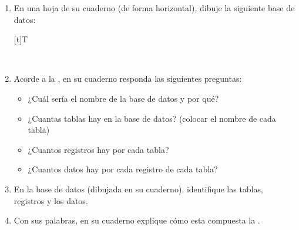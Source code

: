 \documentclass[letterpaper,10pt,spanish]{sphinxmanual}
\let\sphinxpxdimen\pdfpxdimen\else\newdimen\sphinxpxdimen
\begin{document}
\begin{enumerate}
%
\setcounter{enumi}{8}
\item {} 
\sphinxAtStartPar
En una hoja de su cuaderno (de forma horizontal), dibuje la siguiente base de datos:


\begin{savenotes}\sphinxattablestart
\sphinxthistablewithglobalstyle
\centering
\begin{tabulary}{\linewidth}[t]{T}
\sphinxtoprule
\sphinxtableatstartofbodyhook

\begin{sphinxfigure-in-table}
\centering
\capstart
\noindent\sphinxincludegraphics[width=620\sphinxpxdimen]{{image0311}.png}
\label{\detokenize{1_guias/8logica/G822:id14}}\end{sphinxfigure-in-table}\relax
\\
\sphinxbottomrule
\end{tabulary}
\sphinxtableafterendhook\par
\sphinxattableend\end{savenotes}

\item {} 
\sphinxAtStartPar
Acorde a la , en su cuaderno responda las siguientes preguntas:
\begin{itemize}
\item {} 
\sphinxAtStartPar
¿Cuál sería el nombre de la base de datos y por qué?

\item {} 
\sphinxAtStartPar
¿Cuantas tablas hay en la base de datos? (colocar el nombre de cada tabla)

\item {} 
\sphinxAtStartPar
¿Cuantos registros hay por cada tabla?

\item {} 
\sphinxAtStartPar
¿Cuantos datos hay por cada registro de cada tabla?

\end{itemize}

\item {} 
\sphinxAtStartPar
En la base de datos (dibujada en su cuaderno), identifique las tablas, registros y los datos.

\item {} 
\sphinxAtStartPar
Con sus palabras, en su cuaderno explique cómo esta compuesta la .


\end{enumerate}
\end{document}
